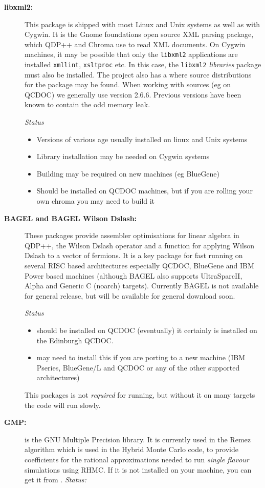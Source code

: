 \documentclass{article}
\begin{document}
\begin{description}
\item[{\bf libxml2: \ } ]
This package is shipped with most Linux and Unix systems as well as with Cygwin. It is the Gnome foundations open source XML parsing package, which QDP++ and Chroma use to read XML documents. On Cygwin machines, it may be possible that only the  {\tt libxml2} applications are installed {\tt xmllint}, {\tt xsltproc} etc. In this case, the {\tt libxml2} {\em libraries} package must also be installed. The project also has a  where source distributions for the package may be found. When working with sources (eg on QCDOC) we generally use version 2.6.6. Previous versions have been known to contain the odd memory leak. {\em Status
\begin{itemize}
\item
Versions of various age usually installed on linux and Unix systems
\item
Library installation may be needed on Cygwin systems
\item
Building may be required on new machines (eg BlueGene)
\item
Should be installed on QCDOC machines, but if you are rolling your own chroma you may need to build it
\end{itemize}
}
\item[{\bf BAGEL and BAGEL Wilson Dslash:\ }]
These packages provide assembler optimisations for linear algebra in QDP++,
the Wilson Dslash operator and a function for applying Wilson Dslash to a 
vector of fermions. It is a key package for fast running on several RISC
based architectures especially QCDOC, BlueGene and IBM Power based machines
(although BAGEL also supports UltraSparcII, Alpha and Generic C (noarch)
targets). Currently BAGEL is not available for general release, but will
be available for general download soon. {\em Status
\begin{itemize}
\item
  should be installed on QCDOC (eventually) it certainly is installed on the Edinburgh QCDOC.
\item
  may need to install this if you are porting to a new machine (IBM Pseries, BlueGene/L and QCDOC or any of the other supported architectures)
\end{itemize}
This packages is not {\em required} for running, but without it on many targets
the code will run slowly.
}
\item[{\bf GMP: }]
is the GNU Multiple Precision library. It is currently used in the Remez algorithm which is used in the Hybrid Monte Carlo code, to provide coefficients for the rational approximations needed to run {\em single flavour} simulations using RHMC. If it is not installed on your machine, you can get it from . {\em Status:
}
\end{description}
\end{document}
